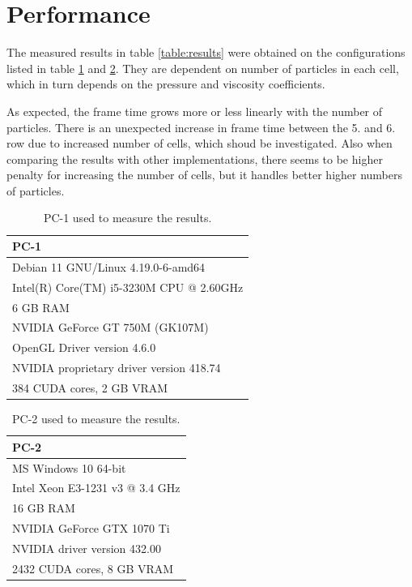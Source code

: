 \documentclass[a4paper,report]{IEEEtran}
\begin{document}
\section{Performance}
The measured results in table \ref{table:results} were obtained on the configurations listed in table \ref{table:pc1} and \ref{table:pc2}. They are dependent on number of particles in each cell, which in turn depends on the pressure and viscosity coefficients.

As expected, the frame time grows more or less linearly with the number of particles. There is an unexpected increase in frame time between the 5. and 6. row due to increased number of cells, which shoud be investigated. Also when comparing the results with other implementations, there seems to be higher penalty for increasing the number of cells, but it handles better higher numbers of particles.
\begin{table}[!htbp]
	\begin{tabular}{l}
		\hline
		\textbf{PC-1} \\
		\hline
		Debian 11 GNU/Linux 4.19.0-6-amd64 \\
		Intel(R) Core(TM) i5-3230M CPU @ 2.60GHz \\
		6 GB RAM \\
		NVIDIA GeForce GT 750M (GK107M) \\
		OpenGL Driver version 4.6.0 \\
		NVIDIA proprietary driver version 418.74 \\
		384 CUDA cores, 2 GB VRAM \\
	\end{tabular}
	\caption{PC-1 used to measure the results.}
	\label{table:pc1}
\end{table}

\begin{table}[!htbp]
\begin{tabular}{l}
\hline
\textbf{PC-2} \\
\hline
	MS Windows 10 64-bit \\
	Intel Xeon E3-1231 v3 @ 3.4 GHz \\
	16 GB RAM \\
	NVIDIA GeForce GTX 1070 Ti \\
	NVIDIA driver version 432.00 \\
	2432 CUDA cores, 8 GB VRAM \\
\end{tabular}
	\caption{PC-2 used to measure the results.}
	\label{table:pc2}
\end{table}
\end{document}
